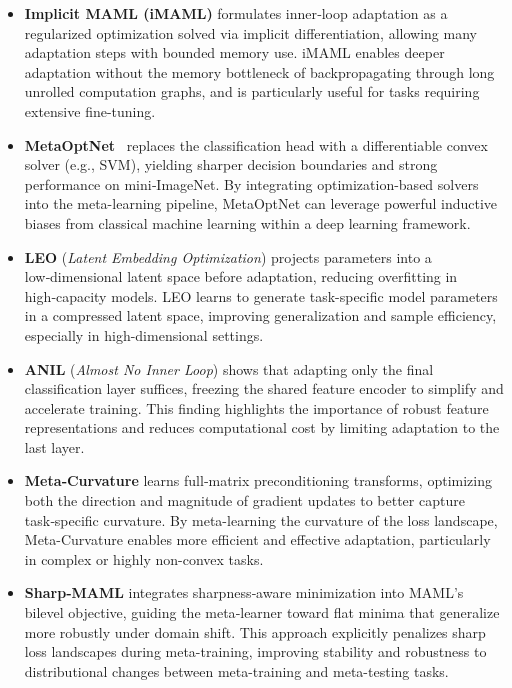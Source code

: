 \begin{itemize}
    \item \textbf{Implicit MAML (iMAML)} \cite{rajeswaran2019imaml} formulates inner‑loop adaptation as a regularized optimization solved via implicit differentiation, allowing many adaptation steps with bounded memory use. iMAML enables deeper adaptation without the memory bottleneck of backpropagating through long unrolled computation graphs, and is particularly useful for tasks requiring extensive fine-tuning.
    
    \sloppy
    \item \textbf{MetaOptNet}~\cite{lee2019metaoptnet} replaces the classification head with a differentiable convex solver (e.g., SVM), yielding sharper decision boundaries and strong performance on mini‑ImageNet. By integrating optimization-based solvers into the meta-learning pipeline, MetaOptNet can leverage powerful inductive biases from classical machine learning within a deep learning framework.
    
    \item \textbf{LEO} (\emph{Latent Embedding Optimization}) \cite{rusu2018meta} projects parameters into a low‑dimensional latent space before adaptation, reducing overfitting in high‑capacity models. LEO learns to generate task-specific model parameters in a compressed latent space, improving generalization and sample efficiency, especially in high-dimensional settings.
    
    \item \textbf{ANIL} (\emph{Almost No Inner Loop}) \cite{raghu2019rapid} shows that adapting only the final classification layer suffices, freezing the shared feature encoder to simplify and accelerate training. This finding highlights the importance of robust feature representations and reduces computational cost by limiting adaptation to the last layer.
    
    \item \textbf{Meta‑Curvature} \cite{park2019meta} learns full‑matrix preconditioning transforms, optimizing both the direction and magnitude of gradient updates to better capture task‑specific curvature. By meta-learning the curvature of the loss landscape, Meta-Curvature enables more efficient and effective adaptation, particularly in complex or highly non-convex tasks.
    
    \item \textbf{Sharp‑MAML} \cite{abbas2022sharp} integrates sharpness‑aware minimization into MAML’s bilevel objective, guiding the meta‑learner toward flat minima that generalize more robustly under domain shift. This approach explicitly penalizes sharp loss landscapes during meta-training, improving stability and robustness to distributional changes between meta-training and meta-testing tasks.
  
\end{itemize}

